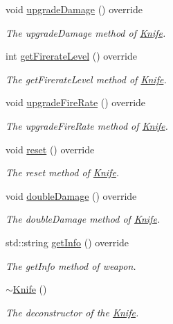 \begin{DoxyCompactItemize}
void \hyperlink{class_knife_ad4a30cd292cabb9dd1d2638f893040b8}{upgrade\+Damage} () override
\begin{DoxyCompactList}\small\item\em The upgrade\+Damage method of \hyperlink{class_knife}{Knife}. \end{DoxyCompactList}\item 
int \hyperlink{class_knife_aaee97b167b530dafa85d8bead3403a10}{get\+Firerate\+Level} () override
\begin{DoxyCompactList}\small\item\em The get\+Firerate\+Level method of \hyperlink{class_knife}{Knife}. \end{DoxyCompactList}\item 
void \hyperlink{class_knife_a9c89877c20a19190103f8b5da013efb5}{upgrade\+Fire\+Rate} () override
\begin{DoxyCompactList}\small\item\em The upgrade\+Fire\+Rate method of \hyperlink{class_knife}{Knife}. \end{DoxyCompactList}\item 
void \hyperlink{class_knife_ad33b6b16ba209474ef0211317fce057b}{reset} () override
\begin{DoxyCompactList}\small\item\em The reset method of \hyperlink{class_knife}{Knife}. \end{DoxyCompactList}\item 
void \hyperlink{class_knife_aa32f6d087a7451a319c640652006a528}{double\+Damage} () override
\begin{DoxyCompactList}\small\item\em The double\+Damage method of \hyperlink{class_knife}{Knife}. \end{DoxyCompactList}\item 
std\+::string \hyperlink{class_knife_aa0d13d7ea1113f3dbd177c65acec9e87}{get\+Info} () override
\begin{DoxyCompactList}\small\item\em The get\+Info method of weapon. \end{DoxyCompactList}\item 
\hyperlink{class_knife_aba6d0d191765285bb5993a6c2f02046e}{$\sim$\+Knife} ()
\begin{DoxyCompactList}\small\item\em The deconstructor of the \hyperlink{class_knife}{Knife}. \end{DoxyCompactList}\end{DoxyCompactItemize}
